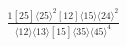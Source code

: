 \documentclass[varwidth, border=5pt]{standalone}
\begin{document}
\begin{my}
$\begin{gathered}
\scriptscriptstyle\frac{1[25]⟨25⟩^2[12]⟨15⟩⟨24⟩^2}{⟨12⟩⟨13⟩[15]⟨35⟩⟨45⟩^4}
\end{gathered}$
\end{my}
\end{document}
